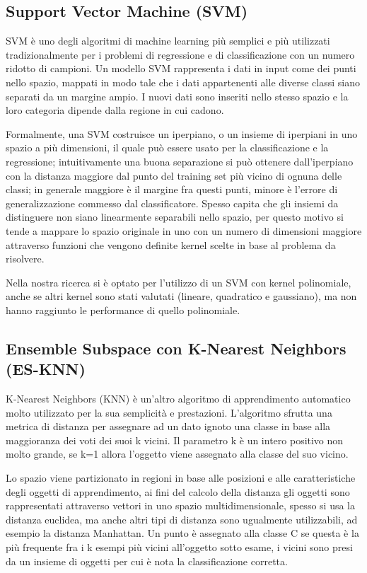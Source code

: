 \subsection{Support Vector Machine (SVM)}

SVM è uno degli algoritmi di machine learning più semplici e più utilizzati tradizionalmente per i problemi di regressione e di classificazione con un numero ridotto di campioni.
Un modello SVM rappresenta i dati in input come dei punti nello spazio, mappati in modo tale che i dati appartenenti alle diverse classi siano separati da un margine ampio. I nuovi dati sono inseriti nello stesso spazio e la loro categoria dipende dalla regione in cui cadono.

Formalmente, una SVM costruisce un iperpiano, o un insieme di iperpiani in uno spazio a più dimensioni, il quale può essere usato per la classificazione e la regressione; intuitivamente una buona separazione si può ottenere dall'iperpiano con la distanza maggiore dal punto del training set più vicino di ognuna delle classi; in generale maggiore è il margine fra questi punti, minore è l'errore di generalizzazione commesso dal classificatore. Spesso capita che gli insiemi da distinguere non siano linearmente separabili nello spazio, per questo motivo si tende a mappare lo spazio originale in uno con un numero di dimensioni maggiore attraverso funzioni che vengono definite kernel scelte in base al problema da risolvere.

Nella nostra ricerca si è optato per l'utilizzo di un SVM con kernel polinomiale, anche se altri kernel sono stati valutati (lineare, quadratico e gaussiano), ma non hanno raggiunto le performance di quello polinomiale.

\subsection{Ensemble Subspace con K-Nearest Neighbors (ES-KNN)}

K-Nearest Neighbors (KNN) è un'altro algoritmo di apprendimento automatico molto utilizzato per la sua semplicità e prestazioni. L'algoritmo sfrutta una metrica di distanza per assegnare ad un dato ignoto una classe in base alla maggioranza dei voti dei suoi k vicini. Il parametro k è un intero positivo non molto grande, se k=1 allora l'oggetto viene assegnato alla classe del suo vicino. 

Lo spazio viene partizionato in regioni in base alle posizioni e alle caratteristiche degli oggetti di apprendimento, ai fini del calcolo della distanza gli oggetti sono rappresentati attraverso vettori in uno spazio multidimensionale, spesso si usa la distanza euclidea, ma anche altri tipi di distanza sono ugualmente utilizzabili, ad esempio la distanza Manhattan. 
Un punto è assegnato alla classe C se questa è la più frequente fra i k esempi più vicini all'oggetto sotto esame, i vicini sono presi da un insieme di oggetti per cui è nota la classificazione corretta. 

